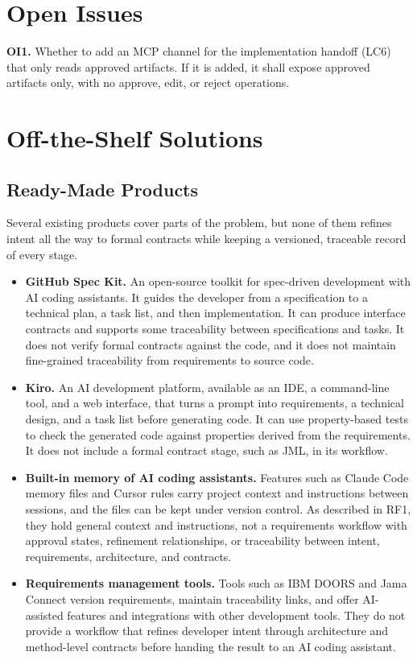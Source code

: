 \documentclass[12pt]{article}
\begin{document}
\section{Open Issues}

\noindent\textbf{OI1.} Whether to add an MCP channel for the implementation
handoff (LC6) that only reads approved artifacts. If it is added, it shall expose approved artifacts
only, with no approve, edit, or reject operations. 

\section{Off-the-Shelf Solutions}
\subsection{Ready-Made Products}

Several existing products cover parts of the problem, but none of them refines
intent all the way to formal contracts while keeping a versioned, traceable
record of every stage.

\begin{itemize}
  \item \textbf{GitHub Spec Kit.} An open-source toolkit for spec-driven
  development with AI coding assistants. It guides the developer from a
  specification to a technical plan, a task list, and then implementation. It
  can produce interface contracts and supports some traceability between
  specifications and tasks. It does not verify formal contracts against the
  code, and it does not maintain fine-grained traceability from requirements to
  source code.
  \item \textbf{Kiro.} An AI development platform, available as an IDE, a
  command-line tool, and a web interface, that turns a prompt into
  requirements, a technical design, and a task list before generating code. It
  can use property-based tests to check the generated code against properties
  derived from the requirements. It does not include a formal contract stage,
  such as JML, in its workflow.
  \item \textbf{Built-in memory of AI coding assistants.} Features such as
  Claude Code memory files and Cursor rules carry project context and
  instructions between sessions, and the files can be kept under version
  control. As described in RF1, they hold general context and instructions, not
  a requirements workflow with approval states, refinement relationships, or
  traceability between intent, requirements, architecture, and contracts.
  \item \textbf{Requirements management tools.} Tools such as IBM DOORS and Jama
  Connect version requirements, maintain traceability links, and offer
  AI-assisted features and integrations with other development tools. They do
  not provide a workflow that refines developer intent through architecture and
  method-level contracts before handing the result to an AI coding assistant.
\end{itemize}
\end{document}
